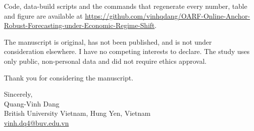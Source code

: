 \documentclass[11pt]{article}
\begin{document}
Code, data-build scripts and the commands that regenerate every number, table and
figure are available at
\url{https://github.com/vinhqdang/OARF-Online-Anchor-Robust-Forecasting-under-Economic-Regime-Shift}.

The manuscript is original, has not been published, and is not under
consideration elsewhere. I have no competing interests to declare. The study uses
only public, non-personal data and did not require ethics approval.

\noindent Thank you for considering the manuscript.

\bigskip
\noindent Sincerely,\\[2pt]
Quang-Vinh Dang\\
British University Vietnam, Hung Yen, Vietnam\\
\href{mailto:vinh.dq4@buv.edu.vn}{vinh.dq4@buv.edu.vn}
\end{document}
